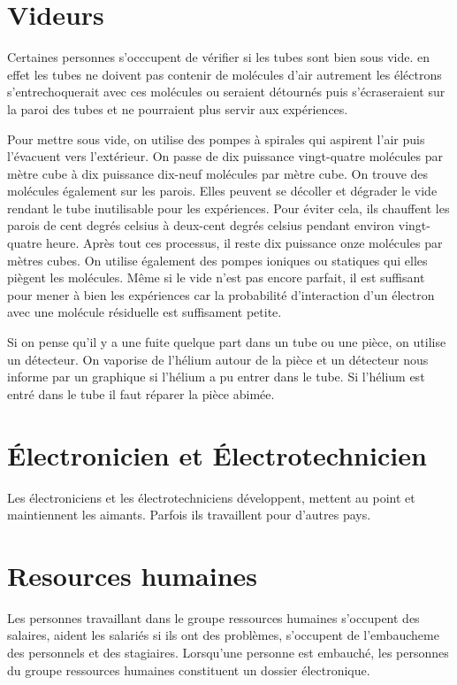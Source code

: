 		\section{Videurs}
			Certaines personnes s'occcupent de vérifier si les tubes sont bien sous vide. en effet les tubes ne doivent pas contenir de molécules d'air autrement les éléctrons s'entrechoquerait avec ces molécules ou seraient détournés puis s'écraseraient sur la paroi des tubes et ne pourraient plus servir aux expériences.
			
			Pour mettre sous vide, on utilise des pompes à spirales qui aspirent l'air puis l'évacuent vers l'extérieur. On passe de dix puissance vingt-quatre molécules par mètre cube à dix puissance dix-neuf molécules par mètre cube. On trouve des molécules également sur les parois. Elles peuvent se décoller et dégrader le vide rendant le tube inutilisable pour les expériences. Pour éviter cela,  ils chauffent les parois de cent degrés celsius à deux-cent degrés celsius pendant environ vingt-quatre heure. Après tout ces processus, il reste dix puissance onze molécules par mètres cubes. On utilise également des pompes ioniques ou statiques qui elles piègent les molécules. Même si le vide n'est pas encore parfait, il est suffisant pour mener à bien les expériences car la probabilité d'interaction d'un électron avec une molécule résiduelle est suffisament petite. 

			Si on pense qu'il y a une fuite quelque part dans un tube ou une pièce, on utilise un détecteur. On vaporise de l'hélium autour de la pièce et un détecteur nous informe par un graphique si l'hélium a pu entrer dans le tube. Si l'hélium est entré dans le tube il faut réparer la pièce abimée.  
		
		\section{Électronicien et Électrotechnicien}
			Les électroniciens et les électrotechniciens développent, mettent au point et maintiennent les aimants. Parfois ils travaillent pour d'autres pays.
		
		\section{Resources humaines}
			Les personnes travaillant dans le groupe ressources humaines s'occupent des salaires, aident les salariés si ils ont des problèmes, s'occupent de l'embaucheme des personnels et des stagiaires. Lorsqu'une personne est embauché, les personnes du groupe ressources humaines constituent un dossier électronique. 

